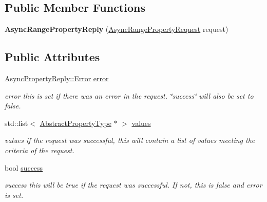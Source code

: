 \subsection*{Public Member Functions}
\begin{DoxyCompactItemize}
\item 
\hypertarget{classAsyncRangePropertyReply_ac253016c5ff4dc8e0ac11f8e98a16025}{{\bfseries Async\+Range\+Property\+Reply} (\hyperlink{classAsyncRangePropertyRequest}{Async\+Range\+Property\+Request} request)}\label{classAsyncRangePropertyReply_ac253016c5ff4dc8e0ac11f8e98a16025}

\end{DoxyCompactItemize}
\subsection*{Public Attributes}
\begin{DoxyCompactItemize}
\item 
\hypertarget{classAsyncRangePropertyReply_a43762c9a2d88ec91e3218f7eca297e56}{\hyperlink{classAsyncPropertyReply_ad91affaa25fcc3b73947a6cf4591e5d1}{Async\+Property\+Reply\+::\+Error} \hyperlink{classAsyncRangePropertyReply_a43762c9a2d88ec91e3218f7eca297e56}{error}}\label{classAsyncRangePropertyReply_a43762c9a2d88ec91e3218f7eca297e56}

\begin{DoxyCompactList}\small\item\em error this is set if there was an error in the request. \char`\"{}success\char`\"{} will also be set to false. \end{DoxyCompactList}\item 
\hypertarget{classAsyncRangePropertyReply_a4ce96fd40ce8ec3fddab46652026734b}{std\+::list$<$ \hyperlink{classAbstractPropertyType}{Abstract\+Property\+Type} $\ast$ $>$ \hyperlink{classAsyncRangePropertyReply_a4ce96fd40ce8ec3fddab46652026734b}{values}}\label{classAsyncRangePropertyReply_a4ce96fd40ce8ec3fddab46652026734b}

\begin{DoxyCompactList}\small\item\em values if the request was successful, this will contain a list of values meeting the criteria of the request. \end{DoxyCompactList}\item 
\hypertarget{classAsyncRangePropertyReply_a4eab37dada60970211e62b0fc3aeac92}{bool \hyperlink{classAsyncRangePropertyReply_a4eab37dada60970211e62b0fc3aeac92}{success}}\label{classAsyncRangePropertyReply_a4eab37dada60970211e62b0fc3aeac92}

\begin{DoxyCompactList}\small\item\em success this will be true if the request was successful. If not, this is false and error is set. \end{DoxyCompactList}\end{DoxyCompactItemize}


